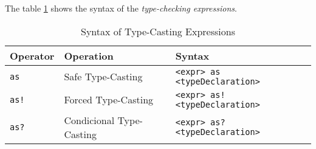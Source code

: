 The table \ref{tab:type-casting-syntax} shows the syntax of
the \emph{type-checking expressions}.

\begin{table}[H]
\centering
\begin{tabular}
{ l l l }
\hline
Operator & Operation & Syntax \\
\hline
\verb|as| & Safe Type-Casting & \verb|<expr> as <typeDeclaration>| \\
\verb|as!| & Forced Type-Casting & \verb|<expr> as! <typeDeclaration>| \\
\verb|as?| & Condicional Type-Casting & \verb|<expr> as? <typeDeclaration>|
\end{tabular}
\caption{Syntax of Type-Casting Expressions}
\label{tab:type-casting-syntax}
\end{table}
